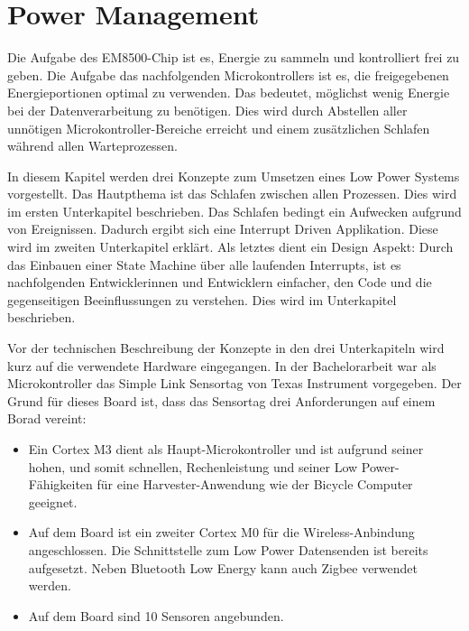 
\section{Power Management}\label{t_power_management} 

Die Aufgabe des EM8500-Chip ist es, Energie zu sammeln und kontrolliert frei zu geben. Die Aufgabe das nachfolgenden Microkontrollers ist es, die freigegebenen Energieportionen optimal zu verwenden. Das bedeutet, möglichst wenig Energie bei der Datenverarbeitung zu benötigen. Dies wird durch Abstellen aller unnötigen Microkontroller-Bereiche erreicht und einem zusätzlichen Schlafen während allen Warteprozessen.

In diesem Kapitel werden drei Konzepte zum Umsetzen eines Low Power Systems vorgestellt. Das Hautpthema ist das Schlafen zwischen allen Prozessen. Dies wird im ersten Unterkapitel beschrieben. Das Schlafen bedingt ein Aufwecken aufgrund von Ereignissen. Dadurch ergibt sich eine Interrupt Driven Applikation. Diese wird im zweiten Unterkapitel erklärt. Als letztes dient ein Design Aspekt: Durch das Einbauen einer State Machine über alle laufenden Interrupts, ist es nachfolgenden Entwicklerinnen und Entwicklern einfacher, den Code und die gegenseitigen Beeinflussungen zu verstehen. Dies wird im Unterkapitel beschrieben.

Vor der technischen Beschreibung der Konzepte in den drei Unterkapiteln wird kurz auf die verwendete Hardware eingegangen. In der Bachelorarbeit war als Microkontroller das Simple Link Sensortag von Texas Instrument vorgegeben. Der Grund für dieses Board ist, dass das Sensortag drei Anforderungen auf einem Borad vereint:

\begin{itemize}
    \item Ein Cortex M3 dient als Haupt-Microkontroller und ist aufgrund seiner hohen, und somit schnellen, Rechenleistung und seiner Low Power-Fähigkeiten für eine Harvester-Anwendung wie der Bicycle Computer geeignet.
    \item Auf dem Board ist ein zweiter Cortex M0 für die Wireless-Anbindung angeschlossen. Die Schnittstelle zum Low Power Datensenden ist bereits aufgesetzt. Neben Bluetooth Low Energy kann auch Zigbee verwendet werden.
    \item Auf dem Board sind 10 Sensoren angebunden.
\end{itemize}

